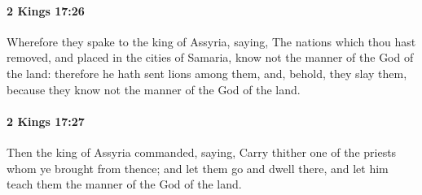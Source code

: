 		\paragraph{2 Kings 17:26} %
			\label{2KINGS-17-26}

			Wherefore they spake to the king of Assyria, saying, The nations which thou hast removed, and placed in the cities of Samaria, know not the manner of the God of the land: therefore he hath sent lions among them, and, behold, they slay them, because they know not the manner of the God of the land.


		\paragraph{2 Kings 17:27} %
			\label{2KINGS-17-27}

			Then the king of Assyria commanded, saying, Carry thither one of the priests whom ye brought from thence; and let them go and dwell there, and let him teach them the manner of the God of the land.

